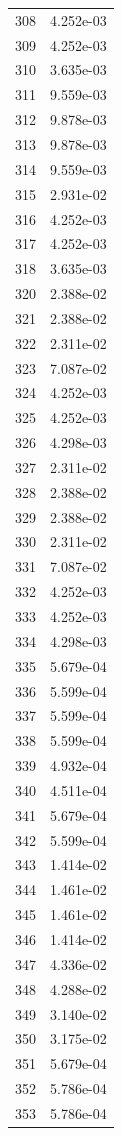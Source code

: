 \documentclass[12pt]{article}
\begin{document}
\begin{longtable}{@{}cc@{}}
308 & 4.252e-03 \\
309 & 4.252e-03 \\
310 & 3.635e-03 \\
311 & 9.559e-03 \\
312 & 9.878e-03 \\
313 & 9.878e-03 \\
314 & 9.559e-03 \\
315 & 2.931e-02 \\
316 & 4.252e-03 \\
317 & 4.252e-03 \\
318 & 3.635e-03 \\
320 & 2.388e-02 \\
321 & 2.388e-02 \\
322 & 2.311e-02 \\
323 & 7.087e-02 \\
324 & 4.252e-03 \\
325 & 4.252e-03 \\
326 & 4.298e-03 \\
327 & 2.311e-02 \\
328 & 2.388e-02 \\
329 & 2.388e-02 \\
330 & 2.311e-02 \\
331 & 7.087e-02 \\
332 & 4.252e-03 \\
333 & 4.252e-03 \\
334 & 4.298e-03 \\
335 & 5.679e-04 \\
336 & 5.599e-04 \\
337 & 5.599e-04 \\
338 & 5.599e-04 \\
339 & 4.932e-04 \\
340 & 4.511e-04 \\
341 & 5.679e-04 \\
342 & 5.599e-04 \\
343 & 1.414e-02 \\
344 & 1.461e-02 \\
345 & 1.461e-02 \\
346 & 1.414e-02 \\
347 & 4.336e-02 \\
348 & 4.288e-02 \\
349 & 3.140e-02 \\
350 & 3.175e-02 \\
351 & 5.679e-04 \\
352 & 5.786e-04 \\
353 & 5.786e-04 \\

\end{longtable}
\end{document}
